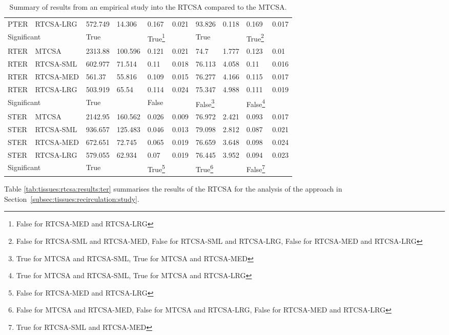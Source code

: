 \begin{table}[H]
\begin{minipage}{\textwidth}
\begin{tabular}{llllllllll}
			PTER & RTCSA-LRG & 572.749 & 14.306 & 0.167 & 0.021 & 93.826 & 0.118 & 0.169 & 0.017 \\ 
			\multicolumn{2}{l}{Significant} & True & & True\footnote{False for RTCSA-MED and RTCSA-LRG} & & True & & True\footnote{False for RTCSA-SML and RTCSA-MED, False for RTCSA-SML and RTCSA-LRG, False for RTCSA-MED and RTCSA-LRG} & \\
			\midrule
			RTER & MTCSA & 2313.88 & 100.596 & 0.121 & 0.021 & 74.7 & 1.777 & 0.123 & 0.01 \\ 
			RTER & RTCSA-SML & 602.977 & 71.514 & 0.11 & 0.018 & 76.113 & 4.058 & 0.11 & 0.016 \\ 
			RTER & RTCSA-MED & 561.37 & 55.816 & 0.109 & 0.015 & 76.277 & 4.166 & 0.115 & 0.017 \\ 
			RTER & RTCSA-LRG & 503.919 & 65.54 & 0.114 & 0.024 & 75.347 & 4.988 & 0.111 & 0.019 \\ 
			\multicolumn{2}{l}{Significant} & True & & False & & False\footnote{True for MTCSA and RTCSA-SML, True for MTCSA and RTCSA-MED} & & False\footnote{True for MTCSA and RTCSA-SML, True for MTCSA and RTCSA-LRG} & \\
			\midrule
			STER & MTCSA & 2142.95 & 160.562 & 0.026 & 0.009 & 76.972 & 2.421 & 0.093 & 0.017 \\ 
			STER & RTCSA-SML & 936.657 & 125.483 & 0.046 & 0.013 & 79.098 & 2.812 & 0.087 & 0.021 \\ 
			STER & RTCSA-MED & 672.651 & 72.745 & 0.065 & 0.019 & 76.659 & 3.648 & 0.098 & 0.024 \\ 
			STER & RTCSA-LRG & 579.055 & 62.934 & 0.07 & 0.019 & 76.445 & 3.952 & 0.094 & 0.023 \\ 
			\multicolumn{2}{l}{Significant} & True & & True\footnote{False for RTCSA-MED and RTCSA-LRG} & & True\footnote{False for MTCSA and RTCSA-MED, False for MTCSA and RTCSA-LRG, False for RTCSA-MED and RTCSA-LRG} & & False\footnote{True for RTCSA-SML and RTCSA-MED} & \\
			\bottomrule
			\end{tabular}					
		\end{minipage}
	\caption{Summary of results from an empirical study into the RTCSA compared to the MTCSA.}
	\label{tab:tissues:rtcsa:results}
\end{table}

Table \ref{tab:tissues:rtcsa:results:ter} summarises the results of the RTCSA for the analysis of the approach in Section~\ref{subsec:tissues:recirculation:study}.

